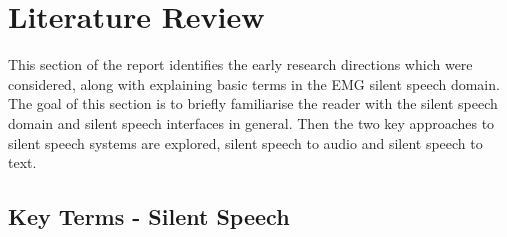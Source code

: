 \iffalse
Mark Scheme:
- Extensive Research
- Understanding of complex subject matter
- Identifies flaws, gaps or inconsistencies in extant knowledge
\fi

\iffalse

Mu-Law compression:
- compresses audio signal into discrete bins whilst preserving dynamic range

Current sEMG Silent Speech Text Classification Research:
- https://dspace.mit.edu/bitstream/handle/1721.1/123121/1128187233-MIT.pdf?sequence=1&isAllowed=y

\fi

\chapter{Literature Review} \label{chap:lit-review}

This section of the report identifies the early research directions which were considered,
along with explaining basic terms in the EMG silent speech domain. The goal of this section
is to briefly familiarise the reader with the silent speech domain and silent speech
interfaces in general. Then the two key approaches to silent speech systems are explored,
silent speech to audio and silent speech to text.

\section{Key Terms - Silent Speech}

